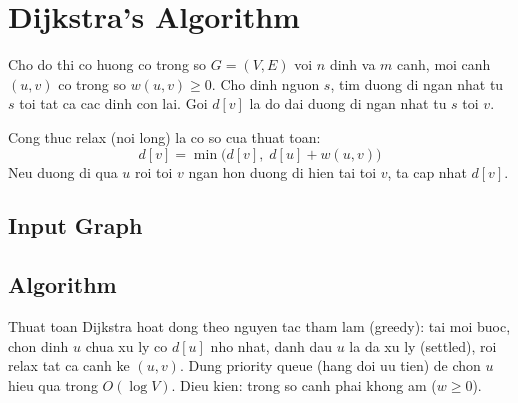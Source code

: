 \section{Dijkstra's Algorithm}

Cho do thi co huong co trong so $G = (V, E)$ voi $n$ dinh va $m$ canh, moi canh $(u, v)$ co trong so $w(u, v) \geq 0$.
Cho dinh nguon $s$, tim duong di ngan nhat tu $s$ toi tat ca cac dinh con lai. Goi $d[v]$ la do dai duong di ngan nhat tu $s$ toi $v$.

Cong thuc relax (noi long) la co so cua thuat toan:
\[
  d[v] = \min\bigl(d[v],\; d[u] + w(u, v)\bigr)
\]
Neu duong di qua $u$ roi toi $v$ ngan hon duong di hien tai toi $v$, ta cap nhat $d[v]$.

\subsection{Input Graph}

\begin{diagram}[id="dijkstra-input"]
\end{diagram}

\subsection{Algorithm}

Thuat toan Dijkstra hoat dong theo nguyen tac tham lam (greedy): tai moi buoc, chon dinh $u$ chua xu ly co $d[u]$ nho nhat,
danh dau $u$ la da xu ly (settled), roi relax tat ca canh ke $(u, v)$. Dung priority queue (hang doi uu tien) de chon $u$
hieu qua trong $O(\log V)$. Dieu kien: trong so canh phai khong am ($w \geq 0$).

